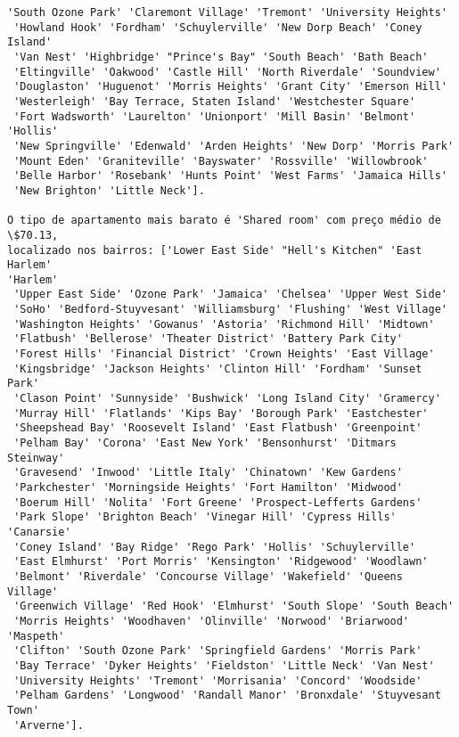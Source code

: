 \documentclass[11pt]{article}
\begin{document}
\begin{Verbatim}[commandchars=\\\{\}]
 'South Ozone Park' 'Claremont Village' 'Tremont' 'University Heights'
 'Howland Hook' 'Fordham' 'Schuylerville' 'New Dorp Beach' 'Coney Island'
 'Van Nest' 'Highbridge' "Prince's Bay" 'South Beach' 'Bath Beach'
 'Eltingville' 'Oakwood' 'Castle Hill' 'North Riverdale' 'Soundview'
 'Douglaston' 'Huguenot' 'Morris Heights' 'Grant City' 'Emerson Hill'
 'Westerleigh' 'Bay Terrace, Staten Island' 'Westchester Square'
 'Fort Wadsworth' 'Laurelton' 'Unionport' 'Mill Basin' 'Belmont' 'Hollis'
 'New Springville' 'Edenwald' 'Arden Heights' 'New Dorp' 'Morris Park'
 'Mount Eden' 'Graniteville' 'Bayswater' 'Rossville' 'Willowbrook'
 'Belle Harbor' 'Rosebank' 'Hunts Point' 'West Farms' 'Jamaica Hills'
 'New Brighton' 'Little Neck'].

O tipo de apartamento mais barato é 'Shared room' com preço médio de \$70.13,
localizado nos bairros: ['Lower East Side' "Hell's Kitchen" 'East Harlem'
'Harlem'
 'Upper East Side' 'Ozone Park' 'Jamaica' 'Chelsea' 'Upper West Side'
 'SoHo' 'Bedford-Stuyvesant' 'Williamsburg' 'Flushing' 'West Village'
 'Washington Heights' 'Gowanus' 'Astoria' 'Richmond Hill' 'Midtown'
 'Flatbush' 'Bellerose' 'Theater District' 'Battery Park City'
 'Forest Hills' 'Financial District' 'Crown Heights' 'East Village'
 'Kingsbridge' 'Jackson Heights' 'Clinton Hill' 'Fordham' 'Sunset Park'
 'Clason Point' 'Sunnyside' 'Bushwick' 'Long Island City' 'Gramercy'
 'Murray Hill' 'Flatlands' 'Kips Bay' 'Borough Park' 'Eastchester'
 'Sheepshead Bay' 'Roosevelt Island' 'East Flatbush' 'Greenpoint'
 'Pelham Bay' 'Corona' 'East New York' 'Bensonhurst' 'Ditmars Steinway'
 'Gravesend' 'Inwood' 'Little Italy' 'Chinatown' 'Kew Gardens'
 'Parkchester' 'Morningside Heights' 'Fort Hamilton' 'Midwood'
 'Boerum Hill' 'Nolita' 'Fort Greene' 'Prospect-Lefferts Gardens'
 'Park Slope' 'Brighton Beach' 'Vinegar Hill' 'Cypress Hills' 'Canarsie'
 'Coney Island' 'Bay Ridge' 'Rego Park' 'Hollis' 'Schuylerville'
 'East Elmhurst' 'Port Morris' 'Kensington' 'Ridgewood' 'Woodlawn'
 'Belmont' 'Riverdale' 'Concourse Village' 'Wakefield' 'Queens Village'
 'Greenwich Village' 'Red Hook' 'Elmhurst' 'South Slope' 'South Beach'
 'Morris Heights' 'Woodhaven' 'Olinville' 'Norwood' 'Briarwood' 'Maspeth'
 'Clifton' 'South Ozone Park' 'Springfield Gardens' 'Morris Park'
 'Bay Terrace' 'Dyker Heights' 'Fieldston' 'Little Neck' 'Van Nest'
 'University Heights' 'Tremont' 'Morrisania' 'Concord' 'Woodside'
 'Pelham Gardens' 'Longwood' 'Randall Manor' 'Bronxdale' 'Stuyvesant Town'
 'Arverne'].

    \end{Verbatim}
\end{document}
